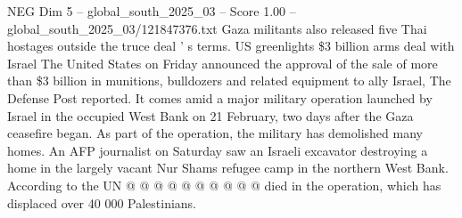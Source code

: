 \begin{textsample}{NEG Dim 5 – global\_south\_2025\_03 – Score 1.00 – global\_south\_2025\_03/121847376.txt}
Gaza militants also released five Thai hostages outside the truce deal ' s terms.
US greenlights \$3 billion arms deal with Israel The United States on Friday announced the approval of the sale of more than \$3 billion in munitions, bulldozers and related equipment to ally Israel, The Defense Post reported.
It comes amid a major military operation launched by Israel in the occupied West Bank on 21 February, two days after the Gaza ceasefire began.
As part of the operation, the military has demolished many homes.
An AFP journalist on Saturday saw an Israeli excavator destroying a home in the largely vacant Nur Shams refugee camp in the northern West Bank.
According to the UN @ @ @ @ @ @ @ @ @ @ died in the operation, which has displaced over 40 000 Palestinians.

\end{textsample}
